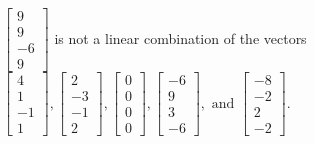 \begin{exercise}
\begin{exerciseStatement}
  \end{exerciseStatement}
  \begin{exerciseAnswer}
   \(\left[\begin{array}{c}
9 \\
9 \\
-6 \\
9
\end{array}\right]\) 
  	 is not  
	a linear combination of the vectors \(\left[\begin{array}{c}
4 \\
1 \\
-1 \\
1
\end{array}\right] , \left[\begin{array}{c}
2 \\
-3 \\
-1 \\
2
\end{array}\right] , \left[\begin{array}{c}
0 \\
0 \\
0 \\
0
\end{array}\right] , \left[\begin{array}{c}
-6 \\
9 \\
3 \\
-6
\end{array}\right] , \text{ and } \left[\begin{array}{c}
-8 \\
-2 \\
2 \\
-2
\end{array}\right]\).

	
  


  \end{exerciseAnswer}
\end{exercise}